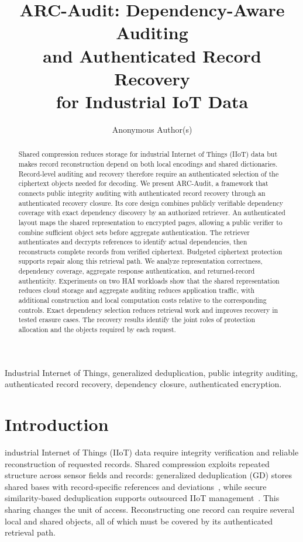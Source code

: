 \documentclass[10pt,journal]{IEEEtran}
\title{ARC-Audit: Dependency-Aware Auditing\\and Authenticated Record Recovery\\for Industrial IoT Data}
\author{Anonymous Author(s)}
\begin{document}
\maketitle
\begin{abstract}
Shared compression reduces storage for industrial Internet of Things (IIoT)
data but makes record reconstruction depend on both local encodings and shared
dictionaries. Record-level auditing and recovery therefore require an authenticated
selection of the ciphertext objects needed for decoding. We present ARC-Audit,
a framework that connects public integrity auditing with authenticated record
recovery through an authenticated recovery closure. Its core design combines
publicly verifiable dependency coverage with exact dependency discovery by an
authorized retriever. An authenticated layout maps the shared representation
to encrypted pages, allowing a public verifier to combine sufficient object
sets before aggregate authentication. The retriever authenticates and decrypts
references to identify actual dependencies, then reconstructs complete records
from verified ciphertext. Budgeted ciphertext protection supports repair along
this retrieval path. We analyze representation correctness, dependency coverage,
aggregate response authentication, and returned-record authenticity. Experiments
on two HAI workloads show that the shared representation reduces cloud
storage and aggregate auditing reduces application traffic, with additional
construction and local computation costs relative to the corresponding
controls. Exact dependency selection reduces retrieval work and improves
recovery in tested erasure cases. The recovery results identify the joint
roles of protection allocation and the objects required by each request.
\end{abstract}
\begin{IEEEkeywords}
Industrial Internet of Things, generalized deduplication, public integrity
auditing, authenticated record recovery, dependency closure, authenticated encryption.
\end{IEEEkeywords}

\section{Introduction}\label{sec:introduction}
 industrial Internet of Things (IIoT) data require
integrity verification and reliable reconstruction of requested records.
Shared compression exploits repeated structure across sensor fields and
records: generalized deduplication (GD) stores shared bases with record-specific
references and deviations~\cite{Talasila2019}, while secure similarity-based
deduplication supports outsourced IIoT management~\cite{Gao2024}. This sharing
changes the unit of access. Reconstructing one record can require several
local and shared objects, all of which must be covered by its authenticated
retrieval path.
\end{document}

